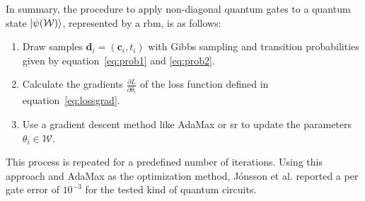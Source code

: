 In summary, the procedure to apply non-diagonal quantum gates to a quantum state $\Ket{\psi(\mathcal{W})}$,
represented by a \gls{rbm}, is as follows:

\begin{enumerate}
    \item Draw samples $\bm{d}_i = (\bm{c}_i, t_i)$ with Gibbs sampling and transition probabilities given by equation~\ref{eq:prob1} and \ref{eq:prob2}.
    \item Calculate the gradients $\frac{\partial L}{\partial \theta_i}$ of the loss function defined in equation~\ref{eq:lossgrad}.
    \item Use a gradient descent method like AdaMax or \gls{sr} to update the parameters $\theta_i \in \mathcal{W}$.
\end{enumerate}

This process is repeated for a predefined number of iterations. Using this approach and AdaMax as the optimization method, J\'{o}nsson et al. \cite{jnsson2018neuralnetwork} reported a per gate error of $10^{-3}$ 
for the tested kind of quantum circuits.
